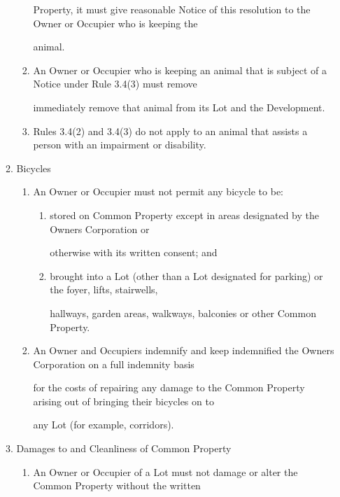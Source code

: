 \documentclass{article}
\begin{document}
\begin{enumerate}[label=\arabic*.]
\begin{enumerate}[label=\arabic{enumi}.\arabic*.]
\begin{enumerate}[label=(\arabic*)]
Property, it must give reasonable Notice of this resolution to the Owner or Occupier who is keeping the 

animal. 

\item  An Owner or Occupier who is keeping an animal that is subject of a Notice under Rule 3.4(3) must remove 

immediately remove that animal from its Lot and the Development. 

\item  Rules 3.4(2) and 3.4(3) do not apply to an animal that assists a person with an impairment or disability. 

\end{enumerate}
\item  Bicycles 

\begin{enumerate}[label=(\arabic*)]
\item  An Owner or Occupier must not permit any bicycle to be: 

\begin{enumerate}[label=(\alph*)]
\item  stored on Common Property except in areas designated by the Owners Corporation or 

otherwise with its written consent; and 

\item  brought into a Lot (other than a Lot designated for parking) or the foyer, lifts, stairwells, 

hallways, garden areas, walkways, balconies or other Common Property. 

\end{enumerate}
\item  An Owner and Occupiers indemnify and keep indemnified the Owners Corporation on a full indemnity basis 

for the costs of repairing any damage to the Common Property arising out of bringing their bicycles on to 

any Lot (for example, corridors). 

\end{enumerate}
\item  Damages to and Cleanliness of Common Property 

\begin{enumerate}[label=(\arabic*)]
\item  An Owner or Occupier of a Lot must not damage or alter the Common Property without the written 


\end{enumerate}
\end{enumerate}
\end{enumerate}
\end{document}
